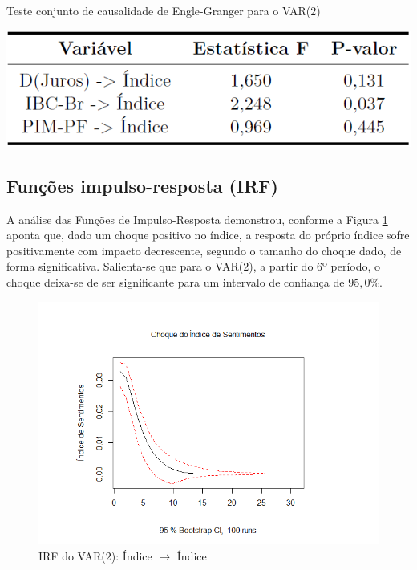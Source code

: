 \begin{table}[hbtp]
	\centering
	\caption{Teste conjunto de causalidade de Engle-Granger para o VAR($2$)} \label{table:granger_conjunto_model2}
	\includegraphics[scale = 0.50]{figuras/granger_conjunto_model2.PNG}
\end{table}

\subsection{Funções impulso-resposta (IRF)}

A análise das Funções de Impulso-Resposta demonstrou, conforme a Figura \ref{figure:irf_indice_indice_model_2} aponta que, dado um choque positivo no índice, a resposta do próprio índice sofre positivamente com impacto decrescente, segundo o tamanho do choque dado, de forma significativa. Salienta-se que para o VAR($2$), a partir do 6º período, o choque deixa-se de ser significante para um intervalo de confiança de $95,0\%$.

\begin{figure}[hbtp]
	\centering
	\caption{IRF do VAR($2$): Índice $\rightarrow$ Índice} \label{figure:irf_indice_indice_model_2}
	\includegraphics[scale = 0.60]{figuras/irf_indice_indice_model_2.PNG}
\end{figure}


